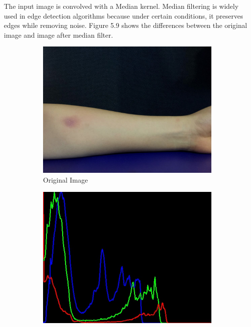 \newpage
 The input image is convolved with a Median kernel. Median filtering is widely used in edge detection algorithms because under certain conditions, it preserves edges while removing noise. Figure 5.9 shows the differences between the original image and image after median filter.
\begin{figure}[!h]
\centering
\begin{subfigure}{.5\textwidth}
  \centering
  \includegraphics[scale=0.23]{img/original}
  \caption{Original Image}
  \label{fig:sub1}
\end{subfigure}%
\begin{subfigure}{.5\textwidth}
  \centering
  \includegraphics[scale=0.43]{img/image}

\end{subfigure}
\end{figure}
